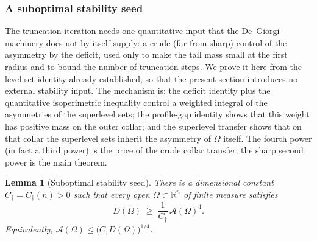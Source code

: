 \documentclass[11pt]{amsart}
\newtheorem{lemma}[theorem]{Lemma}
\theoremstyle{definition}
\newcommand{\R}{\mathbb R}
\newcommand{\Om}{\Omega}
\newcommand{\Fr}{\mathcal A}
\begin{document}
\subsubsection{A suboptimal stability seed}\label{ssec:seed}

The truncation iteration needs one quantitative input that the De~Giorgi
machinery does not by itself supply: a crude (far from sharp) control of the
asymmetry by the deficit, used only to make the tail mass small at the first
radius and to bound the number of truncation steps. We prove it here from the
level-set identity already established, so that the present section introduces
no external stability input. The mechanism is: the deficit identity plus the
quantitative isoperimetric inequality control a weighted integral of the
asymmetries of the superlevel sets; the profile-gap identity shows that this
weight has positive mass on the outer collar; and the superlevel transfer
shows that on that collar the superlevel sets inherit the asymmetry of
$\Om$ itself. The fourth power (in fact a third power) is the price of the
crude collar transfer; the sharp second power is the main theorem.

\begin{lemma}[Suboptimal stability seed]\label{lem:seed}
There is a dimensional constant $C_\dagger=C_\dagger(n)>0$ such that every
open $\Om\subset\R^n$ of finite measure satisfies
\begin{equation}\label{eq:seed}
   D(\Om)\;\ge\;\frac{1}{C_\dagger}\,\Fr(\Om)^{4}.
\end{equation}
Equivalently, $\Fr(\Om)\le\bigl(C_\dagger D(\Om)\bigr)^{1/4}$.
\end{lemma}
\end{document}
